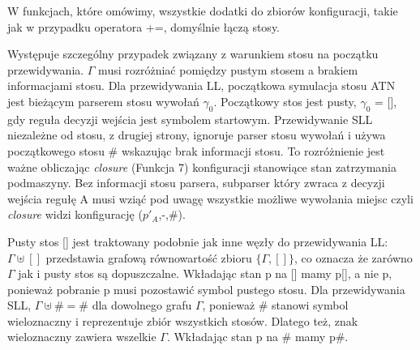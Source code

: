 \par
W funkcjach, które omówimy, wszystkie dodatki do zbiorów konfiguracji, takie jak w przypadku operatora +=, domyślnie łączą stosy.
\par
Występuje szczególny przypadek związany z warunkiem stosu na początku przewidywania.
$\Gamma$ musi rozróżniać pomiędzy pustym stosem a brakiem informacjami stosu.
Dla przewidywania LL, początkowa symulacja stosu ATN jest bieżącym parserem stosu wywołań $\gamma_0$.
Początkowy stos jest pusty, $\gamma_0$ = [], gdy reguła decyzji wejścia jest symbolem startowym.
Przewidywanie SLL niezależne od stosu, z drugiej strony, ignoruje parser stosu wywołań i używa początkowego
stosu \# wskazując brak informacji stosu.
To rozróżnienie jest ważne obliczając \textit{closure} (Funkcja 7) konfiguracji
stanowiące stan zatrzymania podmaszyny. Bez informacji stosu parsera, subparser który zwraca
z decyzji wejścia regułę A musi wziąć pod uwagę wszystkie możliwe wywołania miejsc
czyli \textit{closure} widzi konfigurację ($p'_A$,-,\#).
\par
Pusty stos [] jest traktowany podobnie jak inne węzły do przewidywania LL:
$\Gamma \uplus []$ przedstawia grafową równowartość zbioru $\{\Gamma, []\}$,
co oznacza że zarówno $\Gamma$ jak i pusty stos są dopuszczalne.
Wkładając stan p na [] mamy p[], a nie p, ponieważ pobranie p musi pozostawić symbol pustego stosu.
Dla przewidywania SLL, $\Gamma \uplus \# = \#$ dla dowolnego grafu $\Gamma$, ponieważ \# stanowi symbol
wieloznaczny i reprezentuje zbiór wszystkich stosów. Dlatego też, znak wieloznaczny zawiera wszelkie
$\Gamma$. Wkładając stan p na \# mamy p\#.

